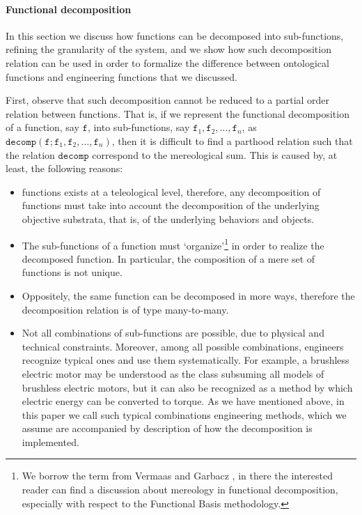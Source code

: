 \documentclass[sw]{iosart2x}
\newcommand{\generalStyle}[1]{\texttt{#1}}
\newcommand{\cst}[1]{\ensuremath{\mathtt{#1}}}
\newcommand{\decom}{\generalStyle{decomp}}
\newcommand{\TODO}[1]{{\color{red} #1}}
\begin{document}
\paragraph{Functional decomposition}
{   
In this section we discuss how functions can be decomposed into sub-functions, refining the granularity of the system, and we show how such decomposition relation can be used in order to formalize the difference between ontological functions and engineering functions that we discussed.

First, observe that such decomposition cannot be reduced to a partial order relation between functions. %
That is, if we represent the functional decomposition of a function, say $\cst{f}$, into sub-functions, say $\cst{f}_1, \cst{f}_2, \dots, \cst{f}_n$, as $\decom(\cst{f};\cst{f}_1,\cst{f}_2,\dots,\cst{f}_n)$, then it is difficult to find a parthood relation such that the relation $\decom$ correspond to the mereological sum.
This is caused by, at least, the following reasons:
\begin{itemize}
  \item functions exists at a teleological level, therefore, any decomposition of functions must take into account the decomposition of the underlying objective substrata, that is, of the underlying behaviors and objects.
  \item The sub-functions of a function must `organize'\footnote{We borrow the term from Vermaas and Garbacz \cite{vermaasFunctionalDecompositionMereology2009a}, in there the interested reader can find a discussion about mereology in functional decomposition, especially with respect to the Functional Basis methodology.} in order to realize the decomposed function. In particular, the composition of a mere set of functions is not unique.
  \item Oppositely, the same function can be decomposed in more ways, therefore the decomposition relation is of type many-to-many.
  \item Not all combinations of sub-functions are possible, due to physical and technical constraints. 
  Moreover, among all possible combinations, engineers recognize typical ones and use them systematically. 
  For example, a brushless electric motor may be understood as the class subsuming all models of brushless electric motors, but it can also be recognized as a method by which electric energy can be converted to torque.
  As we have mentioned above, in this paper we call such typical combinations engineering methods, which we assume are accompanied by description of how the decomposition is implemented.

\end{itemize}}
\end{document}
